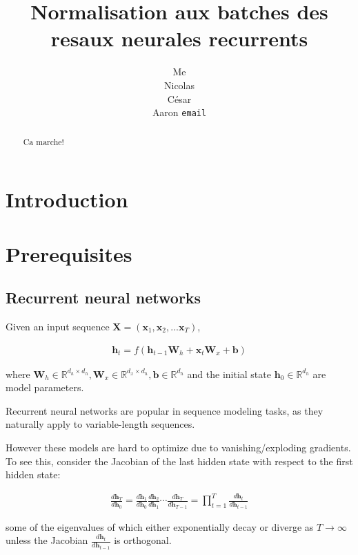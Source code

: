 \documentclass{article} %
\title{Normalisation aux batches des resaux neurales recurrents}
\author{
Me \\
\And
Nicolas \\
\And
C\'esar \\
\And
Aaron
\texttt{email} \\
}
\newcommand{\vect}[1]{\mathbf{#1}}
\newcommand{\mat}[1]{\mathbf{#1}}
\newcommand{\reals}{\mathbb{R}}
\begin{document}
\maketitle

\begin{abstract}
\,Ca marche!
\end{abstract}

\section{Introduction}

\section{Prerequisites}
\subsection{Recurrent neural networks}

Given an input sequence $\mat{X} = ( \vect{x}_1, \vect{x}_2, ... \vect{x}_T )$,

\begin{align}
\vect{h}_t = f(
  \vect{h}_{t-1} \mat{W}_h +
  \vect{x}_t     \mat{W}_x +
  \vect{b})
\end{align}

where $\mat{W}_h \in \reals^{d_h \times d_h},
       \mat{W}_x \in \reals^{d_x \times d_h},
       \vect{b} \in \reals^{d_h}$
  and the initial state $\vect{h}_0 \in \reals^{d_h}$
  are model parameters.

Recurrent neural networks are popular in sequence modeling tasks, as they naturally apply to variable-length sequences.

However these models are hard to optimize due to vanishing/exploding gradients.
To see this, consider the Jacobian of the last hidden state with respect to the first hidden state:

\begin{align}
\frac{d \vect{h}_T}
     {d \vect{h}_0}
 =
\frac{d \vect{h}_1}
     {d \vect{h}_0}
\frac{d \vect{h}_2}
     {d \vect{h}_1}
\cdots
\frac{d \vect{h}_T}
     {d \vect{h}_{T-1}}
 =
\prod_{t = 1}^{T}
\frac{d \vect{h}_t}
     {d \vect{h}_{t-1}}
\end{align}

some of the eigenvalues of which either exponentially decay or diverge as $T \to \infty$ unless the Jacobian
$\frac{d \vect{h}_t}
      {d \vect{h}_{t-1}}$
is orthogonal.
\end{document}
